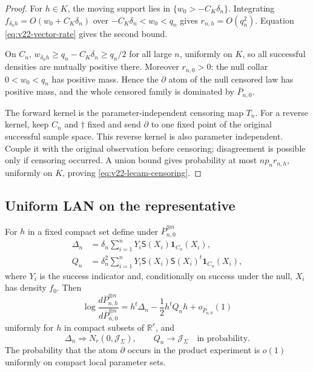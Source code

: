 \begin{proof}
For $h\in K$, the moving support lies in
$\{w_0>-C_K\delta_n\}$.  Integrating
$f_{\delta_nh}=O(w_0+C_K\delta_n)$ over
$-C_K\delta_n<w_0<q_n$ gives $r_{n,h}=O(q_n^2)$.  Equation
\eqref{eq:v22-vector-rate} gives the second bound.

On $C_n$,
$w_{\delta_nh}\ge q_n-C_K\delta_n\ge q_n/2$ for all large $n$, uniformly on
$K$, so all successful densities are mutually positive there.  Moreover
$r_{n,0}>0$: the null collar $0<w_0<q_n$ has positive mass.  Hence the
$\partial$ atom of the null censored law has positive mass, and the whole
censored family is dominated by $\overline P_{n,0}$.

The forward kernel is the parameter-independent censoring map $T_n$.  For a
reverse kernel, keep $C_n$ and $\dagger$ fixed and send $\partial$ to one
fixed point of the original successful sample space.  This reverse kernel is
also parameter independent.  Couple it with the original observation before
censoring; disagreement is possible only if censoring occurred.  A union
bound gives probability at most $np_nr_{n,h}$, uniformly on $K$, proving
\eqref{eq:v22-lecam-censoring}.
\end{proof}

\subsection{Uniform LAN on the representative}

\begin{lemma}
\label{lem:v22-dominated-lan}
For $h$ in a fixed compact set define under
$\overline P_{n,0}^{\otimes n}$
\begin{align}
 \Delta_n&=\delta_n\sum_{i=1}^nY_i
 \mathsf S(X_i)\mathbf1_{C_n}(X_i),
                                      \label{eq:v22-delta}\\
 Q_n&=\delta_n^2\sum_{i=1}^nY_i
 \mathsf S(X_i)\mathsf S(X_i)^t\mathbf1_{C_n}(X_i),
                                      \label{eq:v22-Q}
\end{align}
where $Y_i$ is the success indicator and, conditionally on success under the
null, $X_i$ has density $f_0$.  Then
\begin{equation}\label{eq:v22-dominated-expansion}
 \log\frac{d\overline P_{n,h}^{\otimes n}}
          {d\overline P_{n,0}^{\otimes n}}
 =h^t\Delta_n-\frac12h^tQ_nh+o_{\overline P_{n,0}}(1)
\end{equation}
uniformly for $h$ in compact subsets of $\mathbb R^r$, and
\begin{equation}\label{eq:v22-central-limits}
 \Delta_n\Rightarrow N_r(0,\mathcal J_\Sigma),
 \qquad Q_n\longrightarrow\mathcal J_\Sigma
 \quad\text{in probability}.
\end{equation}
The probability that the atom $\partial$ occurs in the product experiment is
$o(1)$ uniformly on compact local parameter sets.
\end{lemma}

